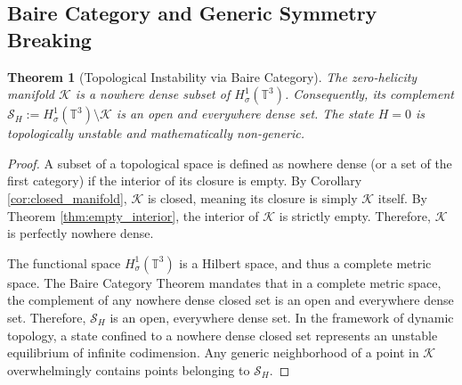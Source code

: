 \documentclass[12pt,a4paper]{article}
\theoremstyle{plain}
\newtheorem{theorem}{Theorem}[section]
\theoremstyle{definition}
\theoremstyle{remark}
\newcommand{\T}{\mathbb{T}}
\begin{document}
\subsection{Baire Category and Generic Symmetry Breaking}

\begin{theorem}[Topological Instability via Baire Category]
\label{thm:baire_instability}
The zero-helicity manifold $\mathcal{K}$ is a nowhere dense subset of $H^1_\sigma(\T^3)$. Consequently, its complement $\mathcal{S}_H := H^1_\sigma(\T^3) \setminus \mathcal{K}$ is an open and everywhere dense set. The state $H=0$ is topologically unstable and mathematically non-generic.
\end{theorem}

\begin{proof}
A subset of a topological space is defined as nowhere dense (or a set of the first category) if the interior of its closure is empty. By Corollary \ref{cor:closed_manifold}, $\mathcal{K}$ is closed, meaning its closure is simply $\mathcal{K}$ itself. By Theorem \ref{thm:empty_interior}, the interior of $\mathcal{K}$ is strictly empty. Therefore, $\mathcal{K}$ is perfectly nowhere dense.

The functional space $H^1_\sigma(\T^3)$ is a Hilbert space, and thus a complete metric space. The Baire Category Theorem mandates that in a complete metric space, the complement of any nowhere dense closed set is an open and everywhere dense set. Therefore, $\mathcal{S}_H$ is an open, everywhere dense set. In the framework of dynamic topology, a state confined to a nowhere dense closed set represents an unstable equilibrium of infinite codimension. Any generic neighborhood of a point in $\mathcal{K}$ overwhelmingly contains points belonging to $\mathcal{S}_H$.
\end{proof}
\end{document}
